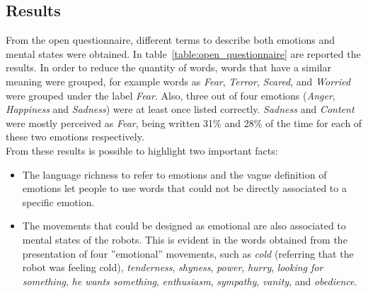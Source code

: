 \subsection{Results}
From the open questionnaire, different terms to describe both emotions and mental states were obtained. In table~\ref{table:open_questionnaire} are reported the results. In order to reduce the quantity of words, words that have a similar meaning were grouped, for example words as \textit{Fear}, \textit{Terror}, \textit{Scared}, and \textit{Worried} were grouped under the label \textit{Fear}. Also, three out of four emotions (\textit{Anger}, \textit{Happiness} and \textit{Sadness}) were at least once listed correctly. \textit{Sadness} and \textit{Content} were mostly perceived as \textit{Fear}, being written 31\% and 28\% of the time for each of these two emotions respectively.\\
From these results is possible to highlight two important facts:
\begin{itemize}
	\item The language richness to refer to emotions and the vague definition of emotions let people to use words that could not be directly associated to a specific emotion. 
	\item The movements that could be designed as emotional are also associated to mental states of the robots. This is evident in the words obtained from the presentation of four ''emotional'' movements, such as \textit{cold} (referring that the robot was feeling cold), \textit{tenderness}, \textit{shyness}, \textit{power}, \textit{hurry}, \textit{looking for something}, \textit{he wants something}, \textit{enthusiasm}, \textit{sympathy}, \textit{vanity}, and \textit{obedience}. 
\end{itemize}
